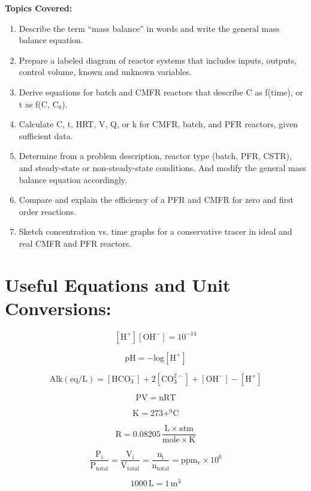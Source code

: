 \documentclass[12pt,letterpaper]{article}
\begin{document}
\textbf{Topics Covered:}\\
\begin{enumerate}
\item Describe the term ``mass balance'' in words and write the general mass balance equation.
\item Prepare a labeled diagram of reactor systems that includes inputs, outputs, control volume, known and unknown variables.
\item Derive equations for batch and CMFR reactors that describe C as f(time), or t as f(C, C$_0$).
\item Calculate C, t, HRT, V, Q, or k for CMFR, batch, and PFR reactors, given sufficient data.
\item Determine from a problem description, reactor type (batch, PFR, CSTR), and steady-state or non-steady-state conditions. And modify the general mass balance equation accordingly.
\item Compare and explain the efficiency of a PFR and CMFR for zero and first order reactions.  
\item Sketch concentration vs. time graphs for a conservative tracer in ideal and real CMFR and PFR reactors. 
\end{enumerate}

\section *{Useful Equations and Unit Conversions:}

\begin{equation*}
\mathrm{[H^+][OH^-] = 10^{-14}}
\end{equation*}

\begin{equation*}
\mathrm{pH = -log[H^+]}
\end{equation*}

\begin{equation*}
\mathrm{Alk (eq/L) = [HCO_3^-] + 2[CO_3^{2-}] + [OH^-] - [H^+]}
\end{equation*}

\begin{equation*}
\mathrm{PV = nRT}
\end{equation*}

\begin{equation*}
\mathrm{K = 273 + ^0C}
\end{equation*}

\begin{equation*}
\mathrm{R = 0.08205\, \frac{L\times atm}{mole\times K}}
\end{equation*}

\begin{equation*}
\mathrm{\frac{P_i}{P_{total}} = \frac{V_i}{V_{total}} = \frac{n_i}{n_{total}} = ppm_v\times 10^6}
\end{equation*}

\begin{equation*}
\mathrm{1000\, L = 1\, m^3}
\end{equation*}
\end{document}
